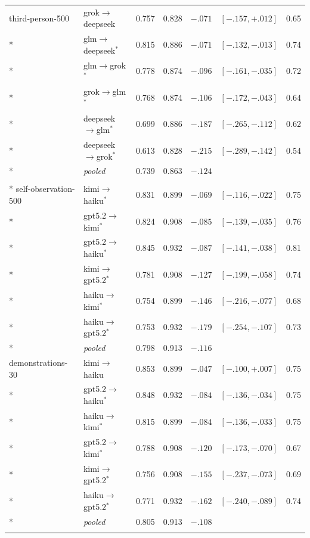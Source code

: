 {\begin{longtable}{llrlrrr}
third-person-500 & grok$\to$deepseek & 0.757 & 0.828 & $-.071$ & $[-.157,+.012]$ & 0.65 \\*
 & glm$\to$deepseek$^{*}$ & 0.815 & 0.886 & $-.071$ & $[-.132,-.013]$ & 0.74 \\*
 & glm$\to$grok$^{*}$ & 0.778 & 0.874 & $-.096$ & $[-.161,-.035]$ & 0.72 \\*
 & grok$\to$glm$^{*}$ & 0.768 & 0.874 & $-.106$ & $[-.172,-.043]$ & 0.64 \\*
 & deepseek$\to$glm$^{*}$ & 0.699 & 0.886 & $-.187$ & $[-.265,-.112]$ & 0.62 \\*
 & deepseek$\to$grok$^{*}$ & 0.613 & 0.828 & $-.215$ & $[-.289,-.142]$ & 0.54 \\*
 & \emph{pooled} & 0.739 & 0.863 & $-.124$ & & \\
\addlinespace
\multicolumn{7}{l}{\emph{Grid B (preregistered)}} \\*
self-observation-500 & kimi$\to$haiku$^{*}$ & 0.831 & 0.899 & $-.069$ & $[-.116,-.022]$ & 0.75 \\*
 & gpt5.2$\to$kimi$^{*}$ & 0.824 & 0.908 & $-.085$ & $[-.139,-.035]$ & 0.76 \\*
 & gpt5.2$\to$haiku$^{*}$ & 0.845 & 0.932 & $-.087$ & $[-.141,-.038]$ & 0.81 \\*
 & kimi$\to$gpt5.2$^{*}$ & 0.781 & 0.908 & $-.127$ & $[-.199,-.058]$ & 0.74 \\*
 & haiku$\to$kimi$^{*}$ & 0.754 & 0.899 & $-.146$ & $[-.216,-.077]$ & 0.68 \\*
 & haiku$\to$gpt5.2$^{*}$ & 0.753 & 0.932 & $-.179$ & $[-.254,-.107]$ & 0.73 \\*
 & \emph{pooled} & 0.798 & 0.913 & $-.116$ & & \\
\addlinespace
demonstrations-30 & kimi$\to$haiku & 0.853 & 0.899 & $-.047$ & $[-.100,+.007]$ & 0.75 \\*
 & gpt5.2$\to$haiku$^{*}$ & 0.848 & 0.932 & $-.084$ & $[-.136,-.034]$ & 0.75 \\*
 & haiku$\to$kimi$^{*}$ & 0.815 & 0.899 & $-.084$ & $[-.136,-.033]$ & 0.75 \\*
 & gpt5.2$\to$kimi$^{*}$ & 0.788 & 0.908 & $-.120$ & $[-.173,-.070]$ & 0.67 \\*
 & kimi$\to$gpt5.2$^{*}$ & 0.756 & 0.908 & $-.155$ & $[-.237,-.073]$ & 0.69 \\*
 & haiku$\to$gpt5.2$^{*}$ & 0.771 & 0.932 & $-.162$ & $[-.240,-.089]$ & 0.74 \\*
 & \emph{pooled} & 0.805 & 0.913 & $-.108$ & & \\
\addlinespace

\end{longtable}}
